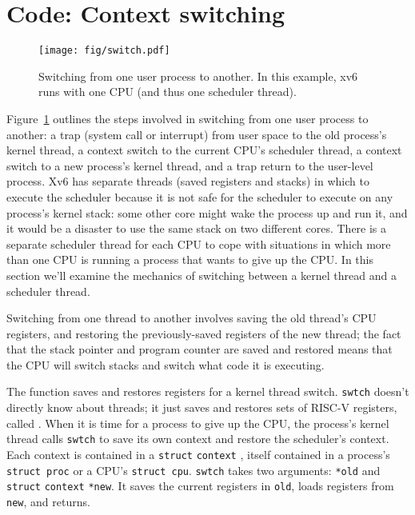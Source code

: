 \section{Code: Context switching}

\begin{figure}[t]
\center
\texttt{[image: fig/switch.pdf]}
\caption{Switching from one user process to another.  In this example, xv6 runs with one CPU (and thus one scheduler thread).}
\label{fig:switch}
\end{figure}

Figure~\ref{fig:switch} 
outlines the steps involved in switching from one
user process to another:
a trap (system
call or interrupt) from user space to the old process's kernel thread,
a context switch to the current CPU's scheduler thread, a context
switch to a new process's kernel thread, and a trap return
to the user-level process.
Xv6 has separate threads
(saved registers and stacks)
in which to execute the scheduler because
it is not safe for the scheduler to execute on
any process's kernel stack: some other core might
wake the process up and run it, and it would be a disaster
to use the same stack on two different cores.
There is a separate scheduler thread for each CPU to cope
with situations in which more than one CPU is running
a process that wants to give up the CPU.
%
%
%
In this section we'll examine the mechanics of switching
between a kernel thread and a scheduler thread.

Switching from one thread to another involves saving the old thread's
CPU registers, and restoring the previously-saved registers of the
new thread; the fact that
the stack pointer and program counter
are saved and restored means that the CPU will switch stacks and
switch what code it is executing.

The function
saves and restores registers for a kernel thread switch.
\lstinline{swtch}
doesn't directly know about threads; it just saves and
restores sets of RISC-V registers, called 
.
When it is time for a process to give up the CPU,
the process's kernel thread calls
\lstinline{swtch}
to save its own context and restore the scheduler's context.
Each context is contained in a
\lstinline{struct}
\lstinline{context}
,
itself contained in a process's
\lstinline{struct proc}
or a CPU's
\lstinline{struct cpu}.
\lstinline{swtch}
takes two arguments:
\lstinline{*old}
and
\lstinline{struct}
\lstinline{context}
\lstinline{*new}.
It saves the current registers in
\lstinline{old},
loads registers from 
\lstinline{new},
and returns.


